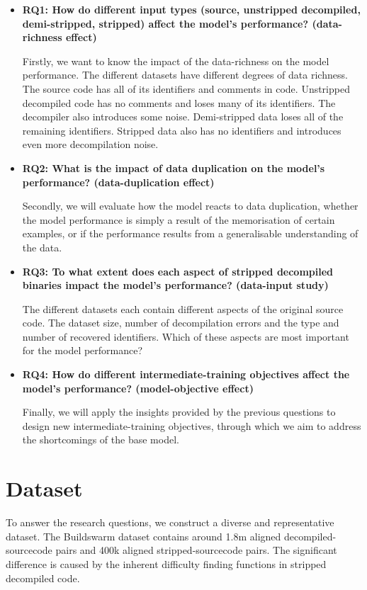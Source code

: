 \begin{itemize}
    \item \textbf{RQ1: How do different input types (source, unstripped decompiled, demi-stripped, stripped) affect the model's performance? (data-richness effect)}
    \begin{sloppypar}
    Firstly, we want to know the impact of the data-richness on the model performance. The different datasets have different degrees of data richness. The source code has all of its identifiers and comments in code. Unstripped decompiled code has no comments and loses many of its identifiers. The decompiler also introduces some noise. Demi-stripped data loses all of the remaining identifiers. Stripped data also has no identifiers and introduces even more decompilation noise.
    \end{sloppypar}
    \item \textbf{RQ2: What is the impact of data duplication on the model's performance? (data-duplication effect)}
    \begin{sloppypar}
    Secondly, we will evaluate how the model reacts to data duplication, whether the model performance is simply a result of the memorisation of certain examples, or if the performance results from a generalisable understanding of the data.
    \end{sloppypar}
    \item \textbf{RQ3: To what extent does each aspect of stripped decompiled binaries impact the model's performance? (data-input study)}
    \begin{sloppypar}
    The different datasets each contain different aspects of the original source code. The dataset size, number of decompilation errors and the type and number of recovered identifiers. Which of these aspects are most important for the model performance? 
    \end{sloppypar}
    \item \textbf{RQ4: How do different intermediate-training objectives affect the model's performance? (model-objective effect)}
    \begin{sloppypar}
    Finally, we will apply the insights provided by the previous questions to design new intermediate-training objectives, through which we aim to address the shortcomings of the base model. 
    \end{sloppypar}
\end{itemize}

\section{Dataset}
To answer the research questions, we construct a diverse and representative dataset. The Buildswarm dataset contains around 1.8m aligned decompiled-sourcecode pairs and 400k aligned stripped-sourcecode pairs. The significant difference is caused by the inherent difficulty finding functions in stripped decompiled code. 

